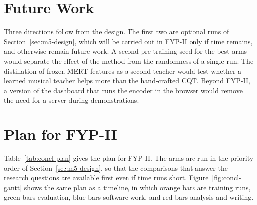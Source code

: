 \section{Future Work}
\label{sec:concl-future}
Three directions follow from the design. The first two are optional runs of Section~\ref{sec:m5-design}, which will be carried out in FYP-II only if time remains, and otherwise remain future work. A second pre-training seed for the best arms would separate the effect of the method from the randomness of a single run. The distillation of frozen MERT features as a second teacher would test whether a learned musical teacher helps more than the hand-crafted CQT. Beyond FYP-II, a version of the dashboard that runs the encoder in the browser would remove the need for a server during demonstrations.

\section{Plan for FYP-II}
\label{sec:concl-plan}
Table~\ref{tab:concl-plan} gives the plan for FYP-II. The arms are run in the priority order of Section~\ref{sec:m5-design}, so that the comparisons that answer the research questions are available first even if time runs short. Figure~\ref{fig:concl-gantt} shows the same plan as a timeline, in which orange bars are training runs, green bars evaluation, blue bars software work, and red bars analysis and writing.

